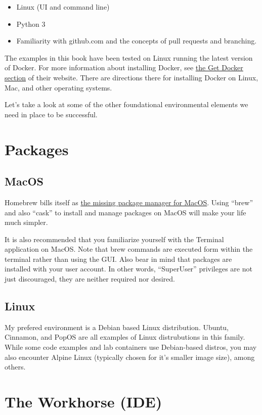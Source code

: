 \begin{itemize}
	\item  Linux (UI and command line)
	\item  Python 3
	\item  Familiarity with github.com and the concepts of pull requests and branching.
\end{itemize}

\justifying
The examples in this book have been tested on Linux running the latest version of Docker. For more
information about installing Docker, see \href{https://docs.docker.com/get-docker/}{the Get Docker section}
of their website. There are directions there for installing Docker on Linux, Mac, and other operating systems.

Let's take a look at some of the other foundational environmental elements we need in place to be successful.

\section{Packages}

\subsection{MacOS}

Homebrew bills itself as \href{https://brew.sh/}{the missing package manager for MacOS}. Using ``brew'' and also
``cask'' to install and manage packages on MacOS will make your life much simpler.

\justifying
It is also recommended that you familiarize yourself with the Terminal application on MacOS. Note that brew
commands are executed form within the terminal rather than using the GUI. Also bear in mind that packages are
installed with your user account. In other words, ``SuperUser'' privileges are not just discouraged, they are
neither required nor desired.

\subsection{Linux}

My prefered environment is a Debian based Linux distribution. Ubuntu, Cinnamon, and PopOS are all examples of 
Linux distrubutions in this family. While some code examples and lab containers use Debian-based distros, you
may also encounter Alpine Linux (typically chosen for it's smaller image size), among others.

\section{The Workhorse (IDE)}

